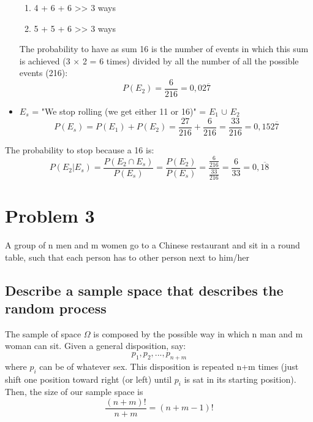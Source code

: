 \documentclass[oneside]{article}			%
\begin{document}
\begin{itemize}
			\begin{enumerate}[label=(\alph*)]
				\item 4 + 6 + 6 >> 3 ways
				\item 5 + 5 + 6 >> 3 ways
			\end{enumerate}
			The probability to have as sum 16 is the number of events in which this sum is achieved (3 $\times$ 2 = 6 times) divided by all the number of all the possible events (216):
			\[P(E_2) = \frac{6}{216} = 0,02\overline{7}\]
		\item $E_s$ = "We stop rolling (we get either 11 or 16)" = $E_1$ $\cup$ $E_2$
		\[P(E_s) = P(E_1) + P(E_2) = \frac{27}{216} + \frac{6}{216} = \frac{33}{216} = 0,152\overline{7}\]
	\end{itemize}
	The probability to stop because a 16 is:
	\\
	\[ P(E_2|E_s) = \frac{P(E_2 \cap E_s)}{P(E_s)} = \frac{P(E_2)}{P(E_s)} = \frac{\frac{6}{216}}{\frac{33}{216}} = \frac{6}{33} = 0,\overline{18} \]


	\clearpage				%
	\setcounter{section}{3}		%
	\setcounter{subsection}{0}		%
	\section*{Problem 3}
	A group of n men and m women go to a Chinese restaurant and sit in a round table, such that each person has to other person next to him/her
	\subsection{Describe a sample space that describes the random process}
	The sample of space $\Omega$ is composed by the possible way in which n man and m woman can sit. Given a general disposition, say:
	\[p_1, p_2, ... , p_{n+m} \]
	where $p_i$ can be of whatever sex. This disposition is repeated n+m times (just shift one position toward right (or left) until $p_i$ is sat in its starting position).
	\\
	Then, the size of our sample space is \[ \frac{(n+m)!}{n+m} = (n+m-1)!\]
\end{document}
